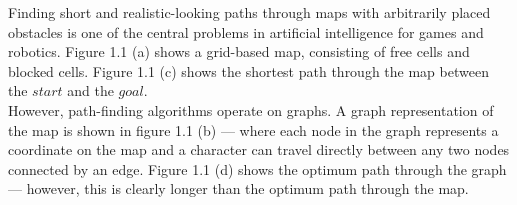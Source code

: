 \documentclass[12pt,notitlepage]{report}
\begin{document}
Finding short and realistic-looking paths through maps with arbitrarily placed obstacles is one of the central problems in artificial intelligence for games and robotics. Figure 1.1 (a) shows a grid-based map, consisting of free cells and blocked cells. Figure 1.1 (c) shows the shortest path through the map between the $start$ and the $goal$.\\

\noindent
However, path-finding algorithms operate on graphs. A graph representation of the map is shown in figure 1.1 (b) --- where each node in the graph represents a coordinate on the map and a character can travel directly between any two nodes connected by an edge. Figure 1.1 (d) shows the optimum path through the graph --- however, this is clearly longer than the optimum path through the map.\\
\end{document}
